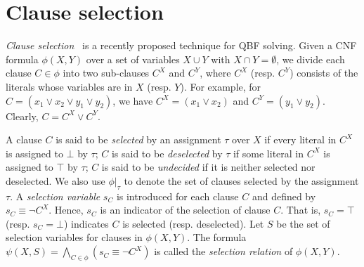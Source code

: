 \section{Clause selection}
\label{sect:clause-select}

\textit{Clause selection}~\cite{Janota2015,Rabe2015} is a recently proposed technique for QBF solving.
Given a CNF formula $\phi(X,Y)$ over a set of variables $X \cup Y$ with $X \cap Y = \emptyset$, we divide each clause $C \in \phi$ into two sub-clauses $C^X$ and $C^Y$, where $C^X$ (resp. $C^Y$) consists of the literals whose variables are in $X$ (resp. $Y$). For example, for $C=(x_1 \vee x_2 \vee y_1 \vee y_2)$, we have $C^X=(x_1 \vee x_2)$ and $C^Y=(y_1 \vee y_2)$. Clearly, $C=C^X \vee C^Y$.

A clause $C$ is said to be \emph{selected} by an assignment $\tau$ over $X$ if every literal in $C^X$ is assigned to $\bot$ by $\tau$; $C$ is said to be \emph{deselected} by $\tau$ if some literal in $C^X$ is assigned to $\top$ by $\tau$; $C$ is said to be \emph{undecided} if it is neither selected nor deselected.
We also use $\phi|_{\tau}$ to denote the set of clauses selected by the assignment $\tau$. A \emph{selection variable} $s_C$ is introduced for each clause $C$ and defined by $s_C \equiv \neg C^X$.
Hence, $s_C$ is an indicator of the selection of clause $C$.
That is, $s_C=\top$ (resp. $s_C=\bot$) indicates $C$ is selected (resp. deselected).
Let $S$ be the set of selection variables for clauses in $\phi(X,Y)$.
The formula $\psi(X,S)=\bigwedge_{C \in \phi}(s_C \equiv \neg C^X)$ is called the \emph{selection relation} of $\phi(X,Y)$.

